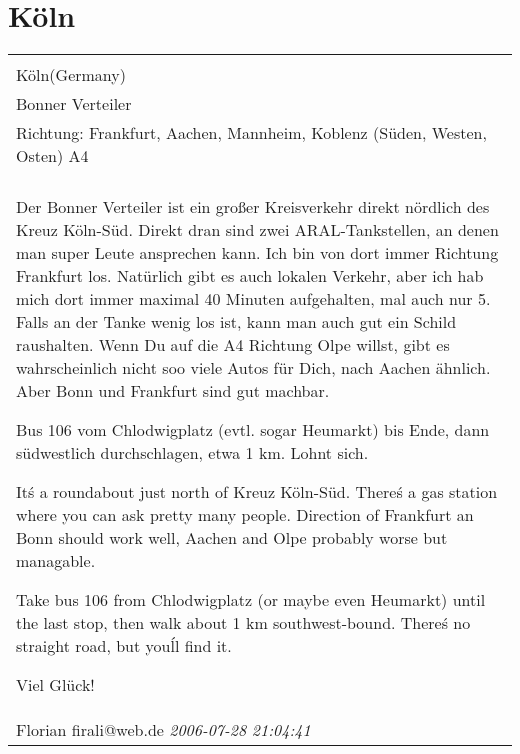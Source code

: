 \documentclass[a4paper,12pt]{article}
\begin{document}
\section{Köln}
\begin{tabular}{|p{13cm}|}
\hline\\
Köln(Germany)\\
Bonner Verteiler\\
Richtung: Frankfurt, Aachen, Mannheim, Koblenz (Süden, Westen, Osten) A4 \\
\hline\\
Der Bonner Verteiler ist ein großer Kreisverkehr direkt nördlich des Kreuz Köln-Süd. Direkt dran sind zwei ARAL-Tankstellen, an denen man super Leute ansprechen kann. Ich bin von dort immer Richtung Frankfurt los. Natürlich gibt es auch lokalen Verkehr, aber ich hab mich dort immer maximal 40 Minuten aufgehalten, mal auch nur 5. Falls an der Tanke wenig los ist, kann man auch gut ein Schild raushalten. Wenn Du auf die A4 Richtung Olpe willst, gibt es wahrscheinlich nicht soo viele Autos für Dich, nach Aachen ähnlich. Aber Bonn und Frankfurt sind gut machbar.

Bus 106 vom Chlodwigplatz (evtl. sogar Heumarkt) bis Ende, dann südwestlich durchschlagen, etwa 1 km. Lohnt sich.

It\'s a roundabout just north of Kreuz Köln-Süd. There\'s a gas station where you can ask pretty many people. Direction of Frankfurt an Bonn should work well, Aachen and Olpe probably worse but managable.

Take bus 106 from Chlodwigplatz (or maybe even Heumarkt) until the last stop, then walk about 1 km southwest-bound. There\'s no straight road, but you\'ll find it.

Viel Glück! \\
Florian firali@web.de \textit{ 2006-07-28 21:04:41 }\\\hline
\end{tabular}
\end{document}
